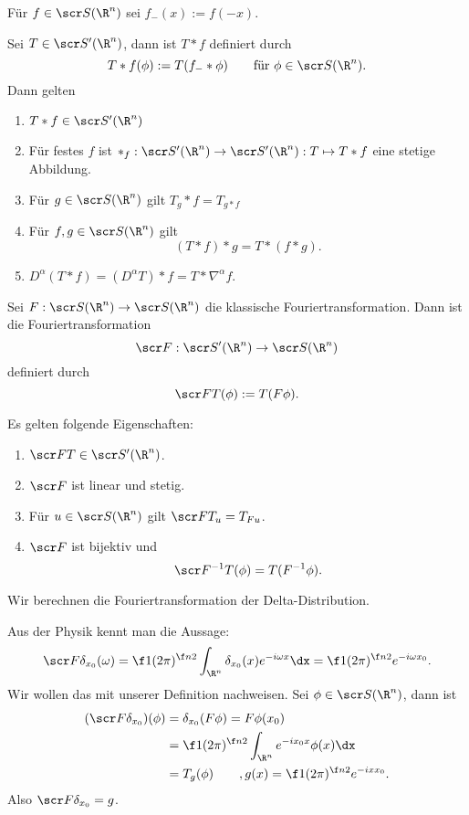\begin{st}[Faltung] \label{5.57}
	Für $f \in \scr S(\R^n)$ sei $f_-(x) := f(-x)$.

	Sei $T \in \scr S'(\R^n)$, dann ist $T \ast f$ definiert durch
	\[
		T \ast f(\phi)
		:= T(f_- \ast \phi)
		\qquad \text{für $\phi \in \scr S(\R^n)$.}
	\]
	Dann gelten
	\begin{enumerate}[1)]
		\item
			$T \ast f \in \scr S'(\R^n)$
		\item
			Für festes $f$ ist $\ast_f : \scr S'(\R^n) \to \scr S'(\R^n) : T \mapsto T\ast f$ eine stetige Abbildung.
		\item
			Für $g \in \scr S(\R^n)$ gilt $T_g \ast f = T_{g \ast f}$
		\item
			Für $f,g \in \scr S(\R^n)$ gilt
			\[
				(T \ast f) \ast g = T \ast (f \ast g).
			\]
		\item
			$D^\alpha (T\ast f) = (D^\alpha T) \ast f = T \ast \nabla^\alpha f$.
	\end{enumerate}
\end{st}

\begin{st}[Fouriertransformation] \label{5.58}
	Sei $F : \scr S(\R^n) \to \scr S(\R^n)$ die klassische Fouriertransformation.
	Dann ist die Fouriertransformation
	\[
		\scr F : \scr S'(\R^n) \to \scr S(\R^n)
	\]
	definiert durch
	\[
		\scr F T(\phi) := T(F \phi).
	\]

	Es gelten folgende Eigenschaften:
	\begin{enumerate}[1)]
		\item
			$\scr F T \in \scr S'(\R^n)$.
		\item
			$\scr F$ ist linear und stetig.
		\item
			Für $u \in \scr S(\R^n)$ gilt $\scr F T_u = T_{F u}$.
		\item
			$\scr F$ ist bijektiv und
			\[
				\scr F^{-1} T(\phi) = T(F^{-1} \phi).
			\]
	\end{enumerate}
\end{st}

\begin{ex} \label{5.59}
	Wir berechnen die Fouriertransformation der Delta-Distribution.

	Aus der Physik kennt man die Aussage:
	\begin{align*}
		\scr F \delta_{x_0}(\omega)
		= \f 1{(2\pi)^{\f n2}} \int_{\R^n} \delta_{x_0}(x) e^{-i\omega x} \dx
		= \f 1{(2\pi)^{\f n2}} e^{-i\omega x_0}.
	\end{align*}
	Wir wollen das mit unserer Definition nachweisen.
	Sei $\phi \in \scr S(\R^n)$, dann ist
	\begin{align*}
		(\scr F \delta_{x_0})(\phi)
		&= \delta_{x_0} (F \phi)
		= F \phi(x_0) \\
		&= \f 1{(2\pi)^{\f n2}} \int_{\R^n} e^{-i x_0 x} \phi(x) \dx \\
		&= T_g(\phi) \qquad, g(x) = \f 1{(2\pi)^{\f n2}} e^{-ix x_0}.
	\end{align*}
	Also $\scr F \delta_{x_0} = g$.
\end{ex}

